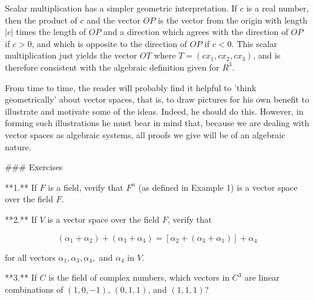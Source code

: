 
Scalar multiplication has a simpler geometric interpretation. If \(c\) is a real number, then the product of \(c\) and the vector \(OP\) is the vector from the origin with length \(|c|\) times the length of \(OP\) and a direction which agrees with the direction of \(OP\) if \(c>0\), and which is opposite to the direction of \(OP\) if \(c<0\). This scalar multiplication just yields the vector \(OT\) where \(T=(cx_{1},cx_{2},cx_{3})\), and is therefore consistent with the algebraic definition given for \(R^{3}\).

From time to time, the reader will probably find it helpful to 'think geometrically' about vector spaces, that is, to draw pictures for his own benefit to illustrate and motivate some of the ideas. Indeed, he should do this. However, in forming such illustrations he must bear in mind that, because we are dealing with vector spaces as algebraic systems, all proofs we give will be of an algebraic nature.

### Exercises

**1.** If \(F\) is a field, verify that \(F^{n}\) (as defined in Example 1) is a vector space over the field \(F\).

**2.** If \(V\) is a vector space over the field \(F\), verify that

\[(\alpha_{1}+\alpha_{2})+(\alpha_{3}+\alpha_{4})=[\alpha_{2}+(\alpha_{3}+ \alpha_{1})]+\alpha_{4}\]

for all vectors \(\alpha_{1},\alpha_{3},\alpha_{4},\) and \(\alpha_{4}\) in \(V\).

**3.** If \(C\) is the field of complex numbers, which vectors in \(C^{3}\) are linear combinations of \((1,0,-1)\), \((0,1,1)\), and \((1,1,1)\)? 